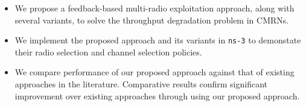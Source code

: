 \begin{itemize}
\item We propose a feedback-based multi-radio exploitation approach, along with several variants, to solve the throughput degradation problem in CMRNs.
\item We implement the proposed approach and its variants in \texttt{ns-3} to demonstate their radio selection and channel selection policies.
\item We compare performance of our proposed approach against that of existing approaches in the literature. Comparative results confirm significant improvement over existing approaches through using our proposed approach.
\end{itemize}
\endinput
